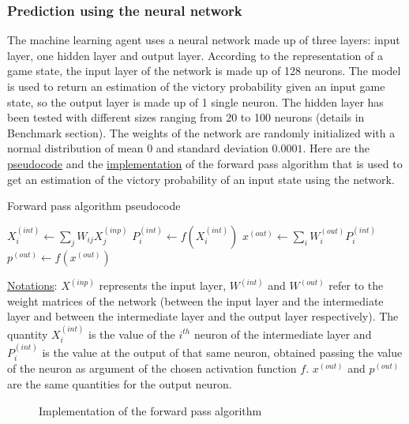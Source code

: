 \documentclass{article}
\begin{document}
\subsubsection{Prediction using the neural network}

The machine learning agent uses a neural network made up of three layers: input layer, one hidden layer and output layer. According to the representation of a game state, the input layer of the network is made up of 128 neurons. The model is used to return an estimation of the victory probability given an input game state, so the output layer is made up of 1 single neuron. The hidden layer has been tested with different sizes ranging from 20 to 100 neurons (details in Benchmark section). The weights of the network are randomly initialized with a normal distribution of mean $0$ and standard deviation $0.0001$. Here are the \hyperref[alg:fp-pseudo]{pseudocode} and the \hyperref[code:fp-code]{implementation} of the forward pass algorithm that is used to get an estimation of the victory probability of an input state using the network.

\begin{algorithm}[H]
	\caption{Forward pass algorithm pseudocode}
    \label{alg:fp-pseudo}
	\begin{algorithmic}[1]
		    \State $X_{i}^{(int)} \leftarrow \sum_{j}{W_{ij} X_{j}^{(inp)}}$
		    \State $P_{i}^{(int)} \leftarrow f(X_{i}^{(int)})$
		\EndFor
		\State $x^{(out)} \leftarrow \sum_{i}{W_{i}^{(out)}P_ {i}^{(int)}}$
		\State $p^{(out)} \leftarrow f(x^{(out)})$
	\end{algorithmic}
\end{algorithm}

\underline{Notations}: $X^{(inp)}$ represents the input layer, $W^{(int)}$ and $W^{(out)}$ refer to the weight matrices of the network (between the input layer and the intermediate layer and between the intermediate layer and the output layer respectively). The quantity $X_{i}^{(int)}$ is the value of the $i^{th}$ neuron of the intermediate layer and $P_{i}^{(int)}$ is the value at the output of that same neuron, obtained passing the value of the neuron as argument of the chosen activation function $f$. $x^{(out)}$ and $p^{(out)}$ are the same quantities for the output neuron.

\begin{figure}[H]
    \begin{center}
      \label{code:fp-code}
      \caption{Implementation of the forward pass algorithm}
    \end{center}
\end{figure}
\end{document}
